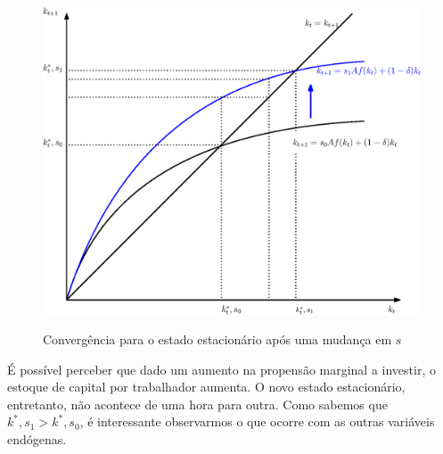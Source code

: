 \documentclass[11pt,a4paper]{article}
\begin{document}
\begin{figure}[!h]
\centering
\caption{Convergência para o estado estacionário após uma mudança em $s$} \vspace{2ex}
\includegraphics[scale=.5]{solow03.eps}
\label{fig:convergencia2}
\end{figure}

É possível perceber que dado um aumento na propensão marginal a investir, o estoque de capital por trabalhador aumenta. O novo estado estacionário, entretanto, não acontece de uma hora para outra. Como sabemos que $k^\ast , s_1 > k^\ast , s_0$, é interessante observarmos o que ocorre com as outras variáveis endógenas. 




 
\end{document}
